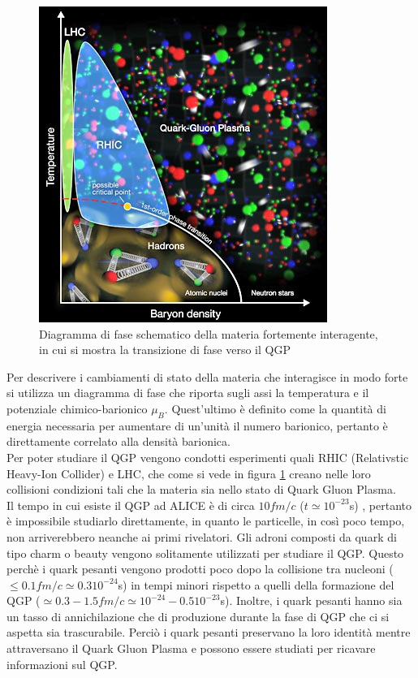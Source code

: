 \begin{figure}[htbp]
        \centering
        \includegraphics[width=0.5\linewidth]{introParticelle/DiagrammaFaseQGP2.jpg}
        \caption{ Diagramma di fase schematico della materia fortemente interagente, in cui si mostra la transizione di fase verso il QGP}
        \label{fig:DiagrammaFaseQCD}
    \end{figure}
    
    
Per descrivere i cambiamenti di stato della materia che interagisce in modo forte si utilizza un diagramma di fase che riporta sugli assi la temperatura e il potenziale chimico-barionico $\mu_B$. Quest'ultimo è definito come la quantità di energia necessaria per aumentare di un'unità il numero barionico, pertanto è direttamente correlato alla densità barionica.
\\Per poter studiare il QGP vengono condotti esperimenti quali RHIC (Relativstic Heavy-Ion Collider) e LHC, che come si vede in figura \ref{fig:DiagrammaFaseQCD} creano nelle loro collisioni condizioni tali che la materia sia nello stato di Quark Gluon Plasma. 
\\Il tempo in cui esiste il QGP ad ALICE è di circa $10 fm/c$ ($t \simeq 10^{-23}$s) \cite{QCD2}, pertanto è impossibile studiarlo direttamente, in quanto le particelle, in così poco tempo, non arriverebbero neanche ai primi rivelatori. Gli adroni composti da quark di tipo charm o beauty vengono solitamente utilizzati per studiare il QGP. Questo perchè i quark pesanti vengono prodotti poco dopo la collisione tra nucleoni ($\leq 0.1 fm/c \simeq 0.3 10^{-24}$s) in tempi minori rispetto a quelli della formazione del QGP ($\simeq 0.3 - 1.5 fm/c \simeq 10^{-24} - 0.5 10^{-23}$s). Inoltre, i quark pesanti hanno sia un tasso di annichilazione che di produzione durante la fase di QGP che ci si aspetta sia trascurabile. Perciò i quark pesanti preservano la loro identità mentre attraversano il Quark Gluon Plasma e possono essere studiati per ricavare informazioni sul QGP. \cite{tesi_barbano}


